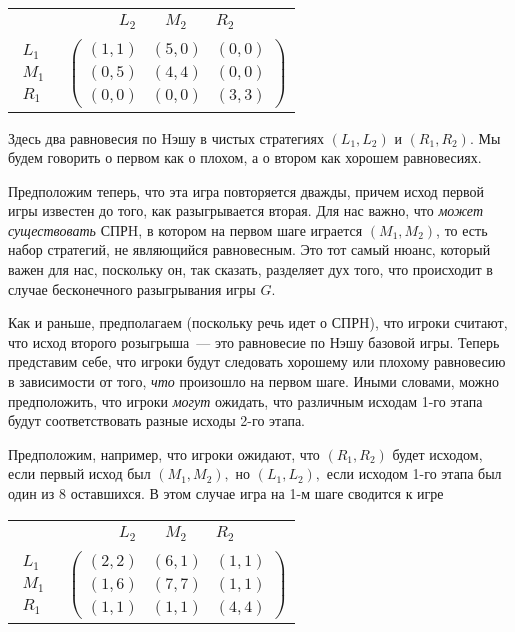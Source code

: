 \begin{center}
\begin{tabular}{cc}
&$\begin{array}{ccc} L_2\quad &M_2&\quad R_2\end{array}$\\
$\begin{array} {c}L_1 \\M_1\\R_1\end{array}$&
$( \begin{array}{ccc} (1,1)&(5,0)&(0,0)\\
(0,5)&(4,4)&(0,0)\\
(0,0)&(0,0)&(3,3) \end{array})$\\
\end{tabular}
\end{center}


Здесь два равновесия по Hэшу в чистых стратегиях $(L_1,L_2)$ и $(R_1,R_2)$.
Мы будем говорить о первом как о плохом, а о втором как хорошем равновесиях.

Предположим теперь, что эта игра повторяется дважды, причем исход первой
игры известен до того, как разыгрывается вторая. Для нас важно,
что \emph{может существовать} СПРH, в котором на первом шаге играется
$(M_1,M_2)$, то есть набор стратегий, не являющийся равновесным.
Это тот самый нюанс, который важен для нас, поскольку
он, так сказать, разделяет дух того, что происходит в случае
бесконечного разыгрывания игры $G$.

Как и раньше, предполагаем (поскольку речь идет о СПРH), что игроки
считают, что исход второго розыгрыша~--- это равновесие по Нэшу базовой
игры. Теперь представим себе, что игроки будут следовать хорошему или
плохому равновесию в зависимости от того, \emph{что} произошло
на первом шаге. Иными словами, можно предположить, что игроки {\it могут} ожидать,
что различным исходам 1-го этапа будут соответствовать разные исходы
2-го этапа.

Предположим, например, что игроки ожидают, что
$(R_1,R_2)$ будет исходом, если первый исход был $(M_1,M_2),$ но
$(L_1,L_2),$ если исходом 1-го этапа  был один из 8 оставшихся. В этом
случае игра на 1-м шаге сводится к игре

\begin{center}
\begin{tabular}{cc}
&$\begin{array}{ccc}L_2\quad&M_2&\quad R_2\end{array}$\\
$\begin{array}{c} L_1\\M_1\\R_1 \end{array}$&
$(\begin{array}{ccc}
(2,2)&(6,1)&(1,1)\\
(1,6)&(7,7)&(1,1)\\
(1,1)&(1,1)&(4,4)\end{array})$\\
\end{tabular}
\end{center}

